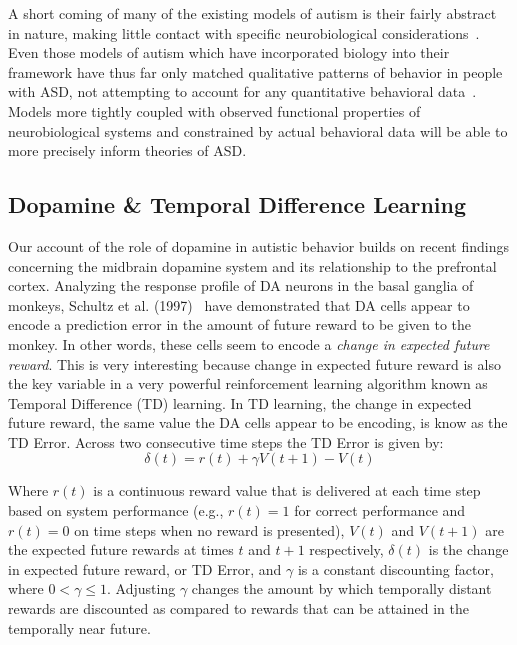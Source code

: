 A short coming of many of the existing models of autism is their fairly abstract in nature, making little contact with specific neurobiological considerations~\cite{CohenIL:1994:AutismLearning,McClellandJL:2000:Autism,OLoughlinC:2000:Coherence}.  Even those models of autism which have incorporated biology into their framework have thus far only matched qualitative patterns of behavior in people with ASD, not attempting to account for any quantitative behavioral data~\cite{GustafssonL:1997:AutismMaps,RefWorks:146}.  Models more tightly coupled with observed functional properties of neurobiological systems and constrained by actual behavioral data will be able to more precisely inform theories of ASD. 

\subsection{Dopamine \& Temporal Difference Learning}
Our account of the role of dopamine in autistic behavior builds on recent findings concerning the midbrain dopamine system and its relationship to the prefrontal cortex. Analyzing the response profile of DA neurons in the basal ganglia of monkeys, Schultz et al. (1997)~\nocite{schultz97td} have demonstrated that DA cells appear to encode a prediction error in the amount of future reward to be given to the monkey.  In other words, these cells seem to encode a \emph{change in expected future reward}.  This is very interesting because change in expected future reward is also the key variable in a very powerful reinforcement learning algorithm known as Temporal Difference (TD) learning.  In TD learning, the change in expected future reward, the same value the DA cells appear to be encoding, is know as the TD Error.  Across two consecutive time steps the TD Error is given by: 
\begin{equation}\delta(t) = r(t) + \gamma V(t+1) - V(t)\end{equation}

Where $r(t)$ is a continuous reward value that is delivered at each time step based on system performance (e.g., $r(t) = 1$ for correct performance and $r(t)=0$ on time steps when no reward is presented), $V(t)$ and $V(t+1)$ are the expected future rewards at times $t$ and $t+1$ respectively, \begin{math}\delta(t)\end{math} is the change in expected future reward, or TD Error, and \begin{math}\gamma\end{math} is a constant discounting factor, where \begin{math}0 < \gamma \leq 1\end{math}.  Adjusting \begin{math}\gamma\end{math} changes the amount by which temporally distant rewards are discounted as compared to rewards that can be attained in the temporally near future. 

